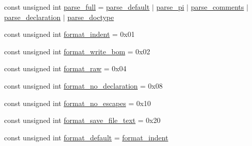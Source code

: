 \begin{DoxyCompactItemize}
\item 
const unsigned int \hyperlink{namespacepugi_a7d773377222d4cb6951297d61605c6a7}{parse\-\_\-full} = \hyperlink{namespacepugi_ad7c927d1c1752330637c3318b0d7b366}{parse\-\_\-default} $|$ \hyperlink{namespacepugi_a8fb7ea408d60b4f2ca79dd30b651f545}{parse\-\_\-pi} $|$ \hyperlink{namespacepugi_adcab316176bfaf69158339962fb4ad38}{parse\-\_\-comments} $|$ \hyperlink{namespacepugi_adb5db03ce720dcd90e900b9bb7e70427}{parse\-\_\-declaration} $|$ \hyperlink{namespacepugi_afa993ffcd3e228d21f48071e7c097f32}{parse\-\_\-doctype}
\item 
const unsigned int \hyperlink{namespacepugi_ace12e8dee65c5bae8ee42a64be7421d3}{format\-\_\-indent} = 0x01
\item 
const unsigned int \hyperlink{namespacepugi_ab863bcafd203aeaa98953df3a998243f}{format\-\_\-write\-\_\-bom} = 0x02
\item 
const unsigned int \hyperlink{namespacepugi_a2dd811716b1c0a6a2431ceca43bc649e}{format\-\_\-raw} = 0x04
\item 
const unsigned int \hyperlink{namespacepugi_a0ec33e4db09260718f7003ed091f5a1b}{format\-\_\-no\-\_\-declaration} = 0x08
\item 
const unsigned int \hyperlink{namespacepugi_ae8d833b4cabc60ba64536d57669454fd}{format\-\_\-no\-\_\-escapes} = 0x10
\item 
const unsigned int \hyperlink{namespacepugi_ab0aae01dc0b870a2673c32ca6623ae09}{format\-\_\-save\-\_\-file\-\_\-text} = 0x20
\item 
const unsigned int \hyperlink{namespacepugi_a325f48a35abbaeacdfd8b7fc9ed1713c}{format\-\_\-default} = \hyperlink{namespacepugi_ace12e8dee65c5bae8ee42a64be7421d3}{format\-\_\-indent}
\end{DoxyCompactItemize}


